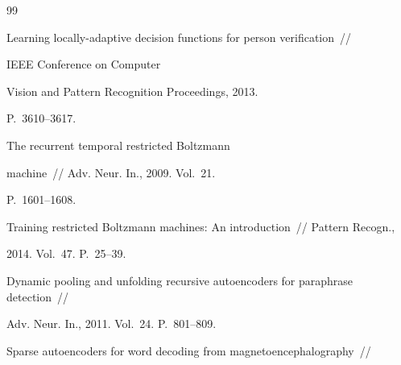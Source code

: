 {{\begin{thebibliography}{99}




Learning locally-adaptive decision functions for person verification~/\!\!/ 


IEEE Conference on Computer 


Vision and Pattern Recognition  Proceedings, 2013. 


P.~3610--3617.











The recurrent temporal restricted Boltzmann


machine~/\!\!/ Adv. Neur. In., 2009. Vol.~21. 


P.~1601--1608.











Training restricted Boltzmann machines: An introduction~/\!\!/ Pattern Recogn., 


2014. Vol.~47. P.~25--39.











Dynamic pooling and unfolding recursive autoencoders for paraphrase detection~/\!\!/ 


Adv. Neur. In., 2011. Vol.~24. P.~801--809.











Sparse autoencoders for word decoding from magnetoencephalography~/\!\!/ 



\end{thebibliography}}}
